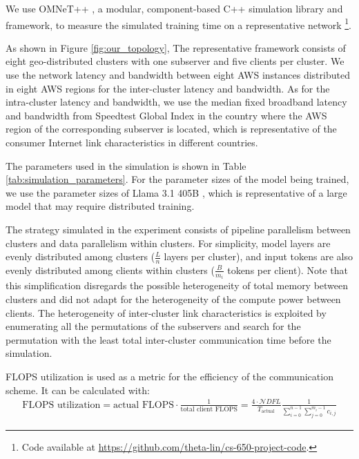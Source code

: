 \documentclass{article}
\begin{document}
We use OMNeT++ \cite{opensim2001omnet}, a modular, component-based C++ simulation library and framework, to measure the simulated training time on a representative network \footnote{Code available at \url{https://github.com/theta-lin/cs-650-project-code}.}.

As shown in Figure \ref{fig:our_topology}, The representative framework consists of eight geo-distributed clusters with one subserver and five clients per cluster. We use the network latency and bandwidth between eight AWS instances distributed in eight AWS regions \cite[Sec. D.3]{yuan2022decentralized} for the inter-cluster latency and bandwidth. As for the intra-cluster latency and bandwidth, we use the median fixed broadband latency and bandwidth from Speedtest Global Index \cite{ookla2025speedtest} in the country where the AWS region of the corresponding subserver is located, which is representative of the consumer Internet link characteristics in different countries.

The parameters used in the simulation is shown in Table \ref{tab:simulation_parameters}. For the parameter sizes of the model being trained, we use the parameter sizes of Llama 3.1 405B \cite{meta2025llama}, which is representative of a large model that may require distributed training.

The strategy simulated in the experiment consists of pipeline parallelism between clusters and data parallelism within clusters. For simplicity, model layers are evenly distributed among clusters ($\frac{L}{n}$ layers per cluster), and input tokens are also evenly distributed among clients within clusters ($\frac{B}{m_i}$ tokens per client). Note that this simplification disregards the possible heterogeneity of total memory between clusters and did not adapt for the heterogeneity of the compute power between clients. The heterogeneity of inter-cluster link characteristics is exploited by enumerating all the permutations of the subservers and search for the permutation with the least total inter-cluster communication time before the simulation.

FLOPS utilization is used as a metric for the efficiency of the communication scheme. It can be calculated with:
\begin{align}
    \text{FLOPS utilization} = \text{actual FLOPS} \cdot \frac{1}{\text{total client FLOPS}} = \frac{4 \cdot \mathcal{N}DFL}{T_{\text{actual}}} \frac{1}{\sum_{i=0}^{n-1} \sum_{j=0}^{m_i-1} c_{i, j}}
\end{align}
\end{document}
